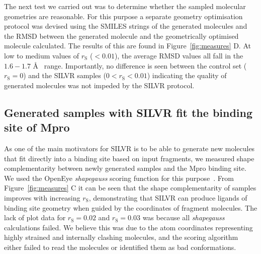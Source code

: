 \documentclass[journal=jacsat,manuscript=article]{achemso}
\begin{document}
The next test we carried out was to determine whether the sampled molecular geometries are reasonable. For this purpose a separate geometry optimisation protocol was devised using the SMILES strings of the generated molecules and the RMSD between the generated molecule and the geometrically optimised molecule calculated. The results of this are found in Figure~\ref{fig:measures} D. At low to medium values of $r_{\mathrm{S}}$ ($< 0.01$), the average RMSD values all fall in the $1.6 - 1.7$ \AA~  range. Importantly, no difference is seen between the control set ($r_{\mathrm{S}}=0$) and the SILVR samples ($0 < r_{\mathrm{S}} < 0.01$) indicating the quality of generated molecules was not impeded by the SILVR protocol. 

\subsection{Generated samples with SILVR fit the binding site of Mpro}
As one of the main motivators for SILVR is to be able to generate new molecules that fit directly into a binding site based on input fragments, we measured shape complementarity between newly generated samples and the Mpro binding site. We used the OpenEye \textit{shapegauss} scoring function for this purpose~\cite{kelley2015posit}. From Figure~\ref{fig:measures} C it can be seen that the shape complementarity of samples improves with increasing $r_{\mathrm{S}}$, demonstrating that SILVR can produce ligands of binding site geometry when guided by the coordinates of fragment molecules. The lack of plot data for $r_{\mathrm{S}}=0.02$ and $r_{\mathrm{S}}=0.03$ was because all \textit{shapegauss} calculations failed. We believe this was due to the atom coordinates representing highly strained and internally clashing molecules, and the scoring algorithm either failed to read the molecules or identified them as bad conformations.
\end{document}
